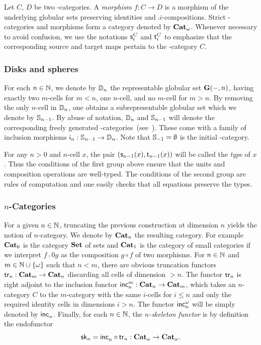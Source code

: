 \begin{paragr}
  Let $C$, $D$ be two \oo-categories. A {\em morphism} $f:C\to D$ is a
morphism of the underlying globular sets preserving identities and
$\comp i$-compositions. Strict \oo-categories and morphisms form a
category denoted by $\mathbf{Cat}_{\omega}$. Whenever necessary to avoid confusion, we use the notations $\mathsf{s}_{i}^C$ and
$\mathsf{t}_{i}^C$ to
emphasize that the corresponding source and target maps pertain to the
\oo-category $C$.
\end{paragr}


\subsubsection{Disks and spheres}\label{ssubsec:disks}
For each $n\in\mathbb N$, we denote by $\mathbb{D}_{n}$ the representable globular
set $\mathbf{G}(-,n)$, having exactly two $m$-cells for $m<n$, one
$n$-cell, and no $m$-cell for $m>n$. By removing the only $n$-cell in
$\mathbb{D}_{n}$, one obtains a subrepresentable globular set which we denote by $\mathbb{S}_{n-1}$. 
By abuse of notation, $\mathbb{D}_{n}$ and $\mathbb{S}_{n-1}$ will
denote the corresponding freely generated  \oo-categories~(see~\cite[14.2]{abgmmm:polybk}). These come
with a family of inclusion morphisms $\mathsf{i}_{n}:\mathbb{S}_{n-1}\to\mathbb{D}_{n}$. Note that $\mathbb{S}_{-1}=\emptyset$ is the initial \oo-category.
\begin{remark}
  For any $n>0$ and $n$-cell $x$, the pair $(\mathsf{s}_{n-1}(x),\mathsf{t}_{n-1}(x))$ will be called the {\em type} of $x$. Thus the conditions of the first group above ensure that the units and composition operations are well-typed. The conditions of the second group are rules of computation and one easily checks that all equations preserve the types. 
\end{remark}
\subsubsection{\texorpdfstring{$n$}{n}-Categories}\label{ssubsec:ncat}
For a given $n\in\mathbb N$, truncating the previous construction at dimension $n$ yields the notion of $n$-category.  We denote by $\mathbf{Cat}_{n}$ the resulting category. For example $\mathbf{Cat}_{0}$ is the category $\mathbf{Set}$ of sets and $\mathbf{Cat}_{1}$ is the category of small categories if we interpret $f\comp 0 g$ as the composition $g\circ f$ of two morphisms.
For $n\in\mathbb N$ and $m\in\mathbb N\cup \left\{\omega\right\}$ such that $n<m$, there are 
obvious truncation functors $\mathsf{tr}_{n}:\mathbf{Cat}_{m}\to \mathbf{Cat}_{n}$ discarding all
cells of dimension $>n$. The functor $\mathsf{tr}_{n}$ is right adjoint to the
inclusion functor  $\mathsf{inc}_{n}^{m}:\mathbf{Cat}_{n}\to\mathbf{Cat}_{m}$, which takes an
$n$-category $C$ to the $m$-category with the same $i$-cells for
$i\leq n$ and only the required identity cells in dimensions
$i>n$. The functor $\mathsf{inc}_{n}^{\omega}$ will be simply denoted by $\mathsf{inc}_{n}^{}$. Finally, for each $n\in\mathbb N$, the {\em $n$-skeleton functor} is by
definition the endofunctor 
\[
  \mathsf{sk}_{n}=\mathsf{inc}_{n}^{}\circ\mathsf{tr}_{n}:\mathbf{Cat}_{\omega}\to \mathbf{Cat}_{\omega}.
  \]


